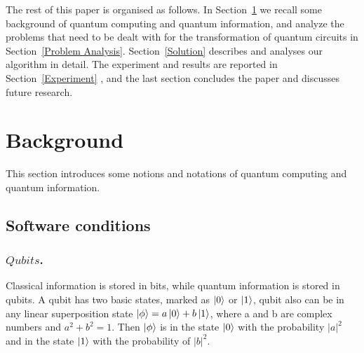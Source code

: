 \documentclass[runningheads]{llncs}
\begin{document}
	The rest of this paper is organised as follows. 
	In Section~\ref{Background} we recall some background of quantum computing and quantum information,
	and analyze the problems that need to be dealt with for the transformation of quantum circuits in Section~\ref{Problem Analysis}.
	Section~\ref{Solution} describes and analyses our algorithm in detail. 
	The experiment and results are reported in Section~\ref{Experiment} , 
	and the last section concludes the paper and discusses future research.

\section{Background}
\label{Background}
This section introduces some notions and notations of quantum computing and quantum information.
\subsection{Software conditions} 
\subsubsection{$Qubits$.}
Classical information is stored in bits, while quantum information is stored in qubits. 
A qubit has two basic states, marked as $\left\vert{0}\right\rangle$ or $\left\vert{1}\right\rangle$, qubit also can be in any linear superposition 
state $\left\vert{\phi}\right\rangle=a\left\vert{0}\right\rangle+b\left\vert{1}\right\rangle$, where a and b are complex numbers and $a^{2}+b^{2}=1$. 
Then $\left\vert{\phi}\right\rangle$ is in the state $\left\vert{0}\right\rangle$ with the probability $|a|^{2}$ 
and in the state $\left\vert{1}\right\rangle$ with the probability of $|b|^{2}$. 
\end{document}
